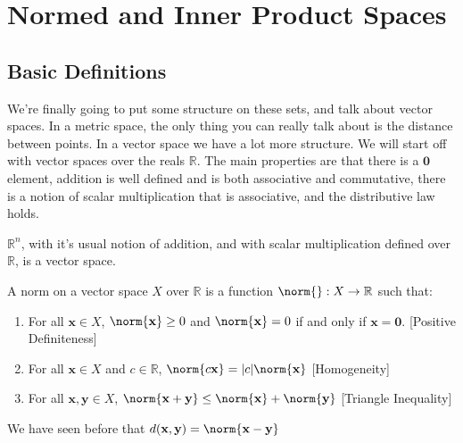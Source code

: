 \chapter{Normed and Inner Product Spaces}
    \section{Basic Definitions}
        We're finally going to put some structure on these
        sets, and talk about vector spaces. In a metric
        space, the only thing you can really talk about
        is the distance between points. In a vector space
        we have a lot more structure. We will start off
        with vector spaces over the reals $\mathbb{R}$.
        The main properties are that there is a
        $\mathbf{0}$ element, addition is well defined
        and is both associative and commutative,
        there is a notion of scalar multiplication that
        is associative, and the distributive law holds.
        \begin{example}
            $\mathbb{R}^{n}$, with it's usual notion
            of addition, and with scalar multiplication
            defined over $\mathbb{R}$, is a vector space.
        \end{example}
        \begin{definition}
            A norm on a vector space $X$ over $\mathbb{R}$
            is a function $\norm{}:X\rightarrow\mathbb{R}$
            such that:
            \begin{enumerate}
                \item For all $\mathbf{x}\in{X}$,
                      $\norm{\mathbf{x}}\geq{0}$ and
                      $\norm{\mathbf{x}}=0$ if and only
                      if $\mathbf{x}=\mathbf{0}$.
                      \hfill[Positive Definiteness]
                \item For all $\mathbf{x}\in{X}$ and
                      $c\in\mathbb{R}$,
                      $\norm{c\mathbf{x}}%
                       =|c|\norm{\mathbf{x}}$
                      \hfill[Homogeneity]
                \item For all $\mathbf{x},\mathbf{y}\in{X}$,
                      $\norm{\mathbf{x}+\mathbf{y}}%
                       \leq\norm{\mathbf{x}}%
                       +\norm{\mathbf{y}}$
                      \hfill[Triangle Inequality]
            \end{enumerate}
        \end{definition}
        We have seen before that
        $d(\mathbf{x},\mathbf{y})=\norm{\mathbf{x}-\mathbf{y}}$
